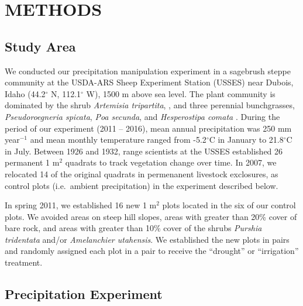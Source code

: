 \documentclass[fleqn,10pt,lineno]{wlpeerj} %
\begin{document}
\hypertarget{methods}{%
\section{METHODS}\label{methods}}

\hypertarget{study-area}{%
\subsection{Study Area}\label{study-area}}

We conducted our precipitation manipulation experiment in a sagebrush
steppe community at the USDA-ARS Sheep Experiment Station (USSES) near
Dubois, Idaho (44.2\(^{\circ}\) N, 112.1\(^{\circ}\) W), 1500 m above
sea level. The plant community is dominated by the shrub
\emph{Artemisia tripartita},
, and three
perennial bunchgrasses, \emph{Pseudoroegneria spicata},
\emph{Poa secunda}, and \emph{Hesperostipa comata}
. During the period of
our experiment (2011 -- 2016), mean annual precipitation was 250 mm
year\(\phantom{}^{-1}\) and mean monthly temperature ranged from
-5.2\(^{\circ}\)C in January to 21.8\(^{\circ}\)C in July. Between 1926
and 1932, range scientists at the USSES established 26 permanent 1
m\(^2\) quadrats to track vegetation change over time. In 2007, we
relocated 14 of the original quadrats in permenanent livestock
exclosures,  as control plots (i.e.~ambient
precipitation) in the experiment described below.

In spring 2011, we established 16 new 1 m\(^2\) plots located in the
 six of our
control plots. We avoided areas on steep hill slopes, areas with greater
than 20\% cover of bare rock, and areas with greater than 10\% cover of
the shrubs \emph{Purshia tridentata} and/or
\emph{Amelanchier utahensis}. We established the new plots in pairs and
randomly assigned each plot in a pair to receive the ``drought'' or
``irrigation'' treatment.

\hypertarget{precipitation-experiment}{%
\subsection{Precipitation Experiment}\label{precipitation-experiment}}
\end{document}
